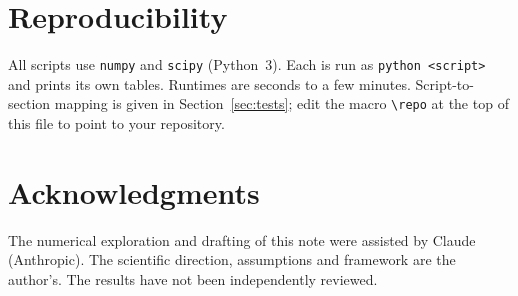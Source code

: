 \documentclass[11pt]{article}
\begin{document}
\section{Reproducibility}

All scripts use \texttt{numpy} and \texttt{scipy} (Python~3). Each is run as \texttt{python <script>} and prints its own tables.
Runtimes are seconds to a few minutes. Script-to-section mapping is given in Section~\ref{sec:tests}; edit the macro
\texttt{\textbackslash repo} at the top of this file to point to your repository.

\section*{Acknowledgments}

The numerical exploration and drafting of this note were assisted by Claude (Anthropic). The scientific direction,
assumptions and framework are the author's. The results have not been independently reviewed.
\end{document}
